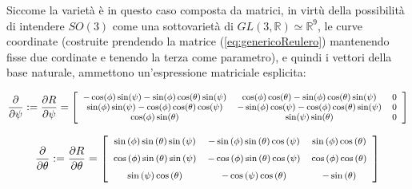 \documentclass[11pt]{report}
\theoremstyle{plain}
\theoremstyle{definition}
\theoremstyle{remark}
\begin{document}
Siccome la varietà è in questo caso composta da matrici, in virtù della possibilità di intendere $SO(3)$ come una sottovarietà di $GL(3,\mathbb{R}) \simeq \mathbb{R}^{9}$, le curve coordinate (costruite prendendo la matrice (\ref{eq:genericoReulero}) mantenendo fisse due cordinate e tenendo la terza come parametro), e quindi i vettori della base naturale, ammettono un'espressione matriciale esplicita:
\begin{flushleft}

\begin{displaymath}\footnotesize
\dfrac{\partial}{\partial \psi} := \dfrac{\partial R}{\partial \psi} = \left[ \begin{array}{ccc}
-\cos(\phi) \sin(\psi) - \sin(\phi) \cos(\theta) \sin(\psi) & \cos(\phi)\cos(\theta) -\sin(\phi)\cos(\theta)\sin(\psi) & 0  \\
\sin(\phi) \sin(\psi) - \cos(\phi) \cos(\theta) \cos(\psi) & - \sin(\phi)\cos(\psi) -\cos(\phi)\cos(\theta)\sin(\psi) & 0  \\
\cos(\phi)\sin(\theta) & \sin(\psi)\sin(\theta) & 0 \\
\end{array} \right]
\end{displaymath}

\begin{displaymath}\footnotesize
\dfrac{\partial}{\partial \theta} := \dfrac{\partial R}{\partial \theta} = \left[ \begin {array}{ccc} \sin \left( \phi \right) \sin \left( \theta \right) \sin \left( \psi \right) &-\sin \left( \phi \right) \sin \left( \theta \right) \cos \left( \psi \right) &\sin \left( \phi \right) \cos \left( \theta \right) \\ \noalign{\medskip}\cos \left( \phi \right) \sin \left( \theta \right) \sin \left( \psi \right) &-\cos \left( \phi \right) \sin \left( \theta \right) \cos \left( \psi \right) &\cos \left( \phi \right) \cos \left( \theta \right) \\ \noalign{\medskip}\sin \left( \psi \right) \cos \left( \theta \right) &-\cos \left( \psi \right) \cos \left( \theta \right) &-\sin \left( \theta \right) \end {array} \right]
\end{displaymath}


\end{flushleft}
\end{document}
